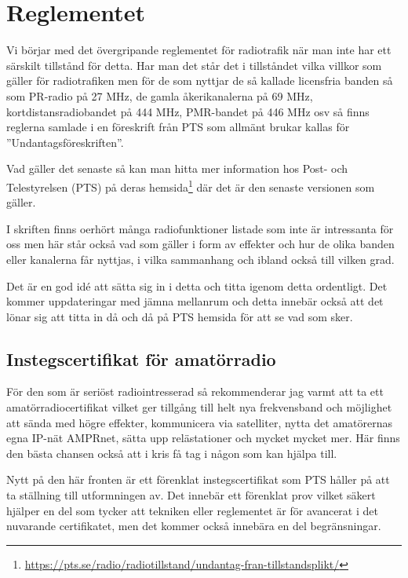 \section*{Reglementet}

Vi börjar med det övergripande reglementet för radiotrafik när man inte har ett särskilt tillstånd för detta. Har man det står det i tillståndet vilka villkor som gäller för radiotrafiken men för de som nyttjar de så kallade licensfria banden så som PR-radio på 27 MHz, de gamla åkerikanalerna på 69 MHz, kortdistansradiobandet på 444 MHz, PMR-bandet på 446 MHz osv så finns reglerna samlade i en föreskrift från PTS som allmänt brukar kallas för ''Undantagsföreskriften''.

Vad gäller det senaste så kan man hitta mer information hos Post- och Telestyrelsen (PTS) på deras hemsida\footnote{\href{https://pts.se/radio/radiotillstand/undantag-fran-tillstandsplikt/}{https://pts.se/radio/radiotillstand/undantag-fran-tillstandsplikt/}} där det är den senaste versionen som gäller.

I skriften finns oerhört många radiofunktioner listade som inte är intressanta för oss men här står också vad som gäller i form av effekter och hur de olika banden eller kanalerna får nyttjas, i vilka sammanhang och ibland också till vilken grad. 

Det är en god idé att sätta sig in i detta och titta igenom detta ordentligt. Det kommer uppdateringar med jämna mellanrum och detta innebär också att det lönar sig att titta in då och då på PTS hemsida för att se vad som sker.

\subsection*{Instegscertifikat för amatörradio}

För den som är seriöst radiointresserad så rekommenderar jag varmt att ta ett amatörradiocertifikat vilket ger tillgång till helt nya frekvensband och möjlighet att sända med högre effekter, kommunicera via satelliter, nytta det amatörernas egna IP-nät AMPRnet, sätta upp relästationer och mycket mycket mer. Här finns den bästa chansen också att i kris få tag i någon som kan hjälpa till. 

Nytt på den här fronten är ett förenklat instegscertifikat som PTS håller på att ta ställning till utformningen av. Det innebär ett förenklat prov vilket säkert hjälper en del som tycker att tekniken eller reglementet är för avancerat i det nuvarande certifikatet, men det kommer också innebära en del begränsningar. 

